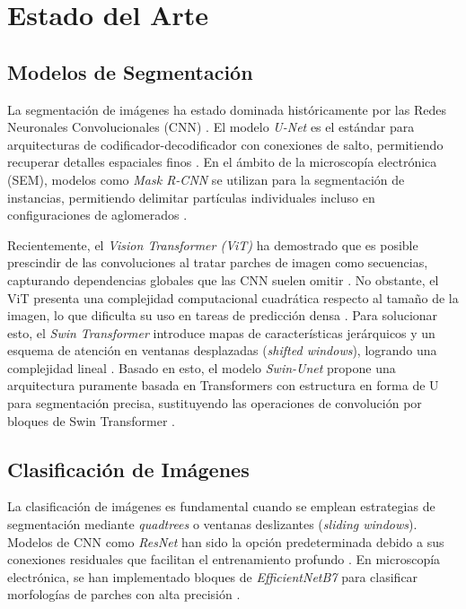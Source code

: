 \documentclass[onecolumn, 12pt , journal]{IEEEtran}
\begin{document}

\section{Estado del Arte}

\subsection{Modelos de Segmentación}
La segmentación de imágenes ha estado dominada históricamente por las Redes Neuronales Convolucionales (CNN) \cite{sakib2019overview}. El modelo \emph{U-Net} es el estándar para arquitecturas de codificador-decodificador con conexiones de salto, permitiendo recuperar detalles espaciales finos \cite{ronneberger2015unet, cao2021swinunet}. En el ámbito de la microscopía electrónica (SEM), modelos como \emph{Mask R-CNN} se utilizan para la segmentación de instancias, permitiendo delimitar partículas individuales incluso en configuraciones de aglomerados \cite{monchot2021titanium, liu2021swin}.

Recientemente, el \emph{Vision Transformer (ViT)} ha demostrado que es posible prescindir de las convoluciones al tratar parches de imagen como secuencias, capturando dependencias globales que las CNN suelen omitir \cite{dosovitskiy2021vit, cao2021swinunet, Zhang_2024}. No obstante, el ViT presenta una complejidad computacional cuadrática respecto al tamaño de la imagen, lo que dificulta su uso en tareas de predicción densa \cite{liu2021swin}. Para solucionar esto, el \emph{Swin Transformer} introduce mapas de características jerárquicos y un esquema de atención en ventanas desplazadas (\textit{shifted windows}), logrando una complejidad lineal \cite{liu2021swin}. Basado en esto, el modelo \emph{Swin-Unet} propone una arquitectura puramente basada en Transformers con estructura en forma de U para segmentación precisa, sustituyendo las operaciones de convolución por bloques de Swin Transformer \cite{cao2021swinunet}.

\subsection{Clasificación de Imágenes}
La clasificación de imágenes es fundamental cuando se emplean estrategias de segmentación mediante \textit{quadtrees} o ventanas deslizantes (\textit{sliding windows}). Modelos de CNN como \emph{ResNet} han sido la opción predeterminada debido a sus conexiones residuales que facilitan el entrenamiento profundo \cite{he2016resnet, sakib2019overview}. En microscopía electrónica, se han implementado bloques de \emph{EfficientNetB7} para clasificar morfologías de parches con alta precisión \cite{classification_report}. 
\end{document}

